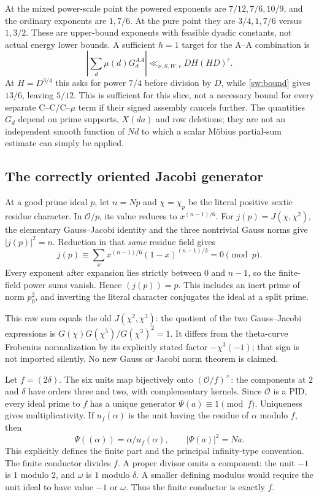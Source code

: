 \documentclass[11pt]{article}
\theoremstyle{definition}\newtheorem{definition}[theorem]{Definition}
\theoremstyle{remark}\newtheorem{remark}[theorem]{Remark}
\begin{document}
At the mixed power-scale point the powered exponents are
$7/12,7/6,10/9$, and the ordinary exponents are $1,7/6$.
At the pure point they are $3/4,1,7/6$ versus $1,3/2$.
These are upper-bound exponents with feasible dyadic constants, not actual
energy lower bounds. A sufficient $h=1$ target for the A--A combination is
\begin{equation}\label{sw:target}
 \left|\sum_d\mu(d)G_d^{AA}\right|
       \ll_{\nu,S,W,\epsilon}DH(HD)^\epsilon.
\end{equation}
At $H=D^{3/4}$ this asks for power $7/4$ before division by $D$, while
\eqref{sw:bound} gives $13/6$, leaving $5/12$.
This is sufficient for this slice, not a necessary bound for every separate
C--C/C--$\mu$ term if their signed assembly cancels further.
The quantities $G_d$ depend on prime supports, $X(da)$ and row deletions;
they are not an independent smooth function of $Nd$ to which a scalar
M\"obius partial-sum estimate can simply be applied.

\subsection{The correctly oriented Jacobi generator}
At a good prime ideal $p$, let $n=Np$ and $\chi=\chi_p$ be the literal
positive sextic residue character. In $\mathcal O/p$, its value reduces
to $x^{(n-1)/6}$. For $j(p)=J(\chi,\chi^2)$, the elementary Gauss--Jacobi
identity and the three nontrivial Gauss norms give $|j(p)|^2=n$.
Reduction in that \emph{same} residue field gives
\[
 j(p)\equiv\sum_x x^{(n-1)/6}(1-x)^{(n-1)/3}=0\pmod p.
\]
Every exponent after expansion lies strictly between $0$ and $n-1$,
so the finite-field power sums vanish. Hence $(j(p))=p$.
This includes an inert prime of norm $p_0^2$, and inverting the literal
character conjugates the ideal at a split prime.

This raw sum equals the old $J(\chi^2,\chi^3)$: the quotient of the two
Gauss--Jacobi expressions is
$G(\chi)G(\chi^5)/G(\chi^3)^2=1$.
It differs from the theta-curve Frobenius normalization by its explicitly
stated factor $-\chi^3(-1)$; that sign is not imported silently.
No new Gauss or Jacobi norm theorem is claimed.

Let $f=(2\delta)$. The six units map bijectively onto
$(\mathcal O/f)^\times$: the components at $2$ and $\delta$ have orders
three and two, with complementary kernels. Since $\mathcal O$ is a PID,
every ideal prime to $f$ has a unique generator $\Psi(a)\equiv1\pmod f$.
Uniqueness gives multiplicativity. If $u_f(\alpha)$ is the unit having
the residue of $\alpha$ modulo $f$, then
\[
 \Psi((\alpha))=\alpha/u_f(\alpha),\qquad
 |\Psi(a)|^2=Na.
\]
This explicitly defines the finite part and the principal infinity-type
convention. The finite conductor divides $f$. A proper divisor omits a
component: the unit $-1$ is $1$ modulo $2$, and $\omega$ is $1$ modulo
$\delta$. A smaller defining modulus would require the unit ideal to
have value $-1$ or $\omega$. Thus the finite conductor is exactly $f$.
\end{document}
